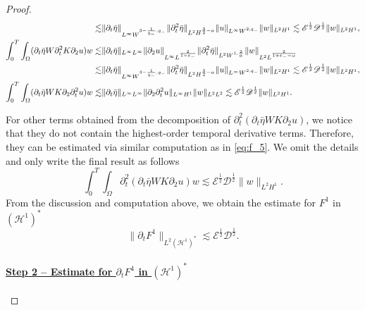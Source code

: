 \documentclass[letterpaper,reqno,10pt,twoside]{amsart}
\theoremstyle{definition}
\theoremstyle{remark}
\def\p{\partial}
\begin{document}
\begin{proof}
\begin{align}{\label{eq:f_5}}
\begin{aligned}
					\lesssim &\|\p_{t}\bar{\eta}\|_{L^{\infty}W^{3-\frac{1}{q_{-}},q_{-}}}\|\p_{t}^{2}\bar{\eta}\|_{L^{2}H^{\frac{3}{2}-\alpha}}\|u\|_{L^{\infty}W^{2,q_{-}}}\|w\|_{L^{2}H^{1}}\lesssim\mathscr{E}^{\frac{1}{2}}\mathscr{D}^{\frac{1}{2}}\|w\|_{L^{2}H^{1}},\\
					\int_{0}^{T}\int_{\Omega}(\p_{t}\bar{\eta}W\p_{t}^{2}K\p_{2}u)w\lesssim&\|\p_{t}\bar{\eta}\|_{L^{\infty}L^{\infty}}\|\p_{2}u\|_{L^{\infty}L^{\frac{2}{1-\varepsilon_{-}}}}\|\p_{t}^{2}\bar{\eta}\|_{L^{2}W^{1,\frac{2}{\alpha}}}\|w\|_{L^{2}L^{\frac{2}{1+\varepsilon_{-}-\alpha}}}\\
					\lesssim &\|\p_{t}\bar{\eta}\|_{L^{\infty}W^{3-\frac{1}{q_{-}},q_{-}}}\|\p_{t}^{2}\bar{\eta}\|_{L^{2}H^{\frac{3}{2}-\alpha}}\|u\|_{L^{\infty}W^{2,q_{-}}}\|w\|_{L^{2}H^{1}}\lesssim \mathscr{E}^{\frac{1}{2}}\mathscr{D}^{\frac{1}{2}}\|w\|_{L^{2}H^{1}},\\
					\int_{0}^{T}\int_{\Omega}(\p_{t}\bar{\eta}WK\p_{2}\p_{t}^{2}u)w\lesssim&\|\p_{t}\bar{\eta}\|_{L^{\infty}L^{\infty}}\|\p_{2}\p_{t}^{2}u\|_{L^{\infty}H^{1}}\|w\|_{L^{2}L^{2}}\lesssim \mathscr{E}^{\frac{1}{2}}\mathscr{D}^{\frac{1}{2}}\|w\|_{L^{2}H^{1}}.
				\end{aligned}
			\end{align}
			
			\noindent For other terms obtained from the decomposition of $\p_{t}^{2}(\p_{t}\bar{\eta}WK\p_{2}u)$, we notice that they do not contain the highest-order temporal derivative terms. Therefore, they can be estimated via similar computation as in \eqref{eq:f_5}. We omit the details and only write the final result as follows
			\[
			\int_{0}^{T}\int_{\Omega}\p_{t}^{2}(\p_{t}\bar{\eta}WK\p_{2}u)w\lesssim \mathscr{E}^{\frac{1}{2}}\mathscr{D}^{\frac{1}{2}}\|w\|_{L^{2}H^{1}}.
			\]
			From the discussion and computation above, we obtain the estimate for $F^{1}$ in $(\mathcal{H}^1)^{*}$
			\[
			\|\p_{t}F^{1}\|_{L^{2}(\mathcal{H}^1)^{*}}\lesssim \mathscr{E}^{\frac{1}{2}}\mathscr{D}^{\frac{1}{2}}.
			\]
			
			\paragraph{\underline{Step 2 -- Estimate for $\p_{t}F^{4}$ in $(\mathcal{H}^1)^{*}$}} 
			

\end{proof}
\end{document}
